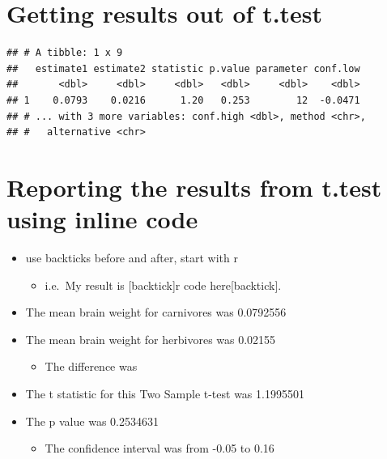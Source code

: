 \documentclass[
]{book}
\newenvironment{Shaded}{\begin{snugshade}}{\end{snugshade}}
\newcommand{\DataTypeTok}[1]{\textcolor[rgb]{0.13,0.29,0.53}{#1}}
\newcommand{\KeywordTok}[1]{\textcolor[rgb]{0.13,0.29,0.53}{\textbf{#1}}}
\newcommand{\NormalTok}[1]{#1}
\newcommand{\OperatorTok}[1]{\textcolor[rgb]{0.81,0.36,0.00}{\textbf{#1}}}
\newcommand{\StringTok}[1]{\textcolor[rgb]{0.31,0.60,0.02}{#1}}
\providecommand{\tightlist}{%
  \setlength{\itemsep}{0pt}\setlength{\parskip}{0pt}}
\begin{document}
\begin{Shaded}
\end{Shaded}

\hypertarget{getting-results-out-of-t.test-3}{%
\section{Getting results out of t.test}\label{getting-results-out-of-t.test-3}}

\begin{verbatim}
## # A tibble: 1 x 9
##   estimate1 estimate2 statistic p.value parameter conf.low
##       <dbl>     <dbl>     <dbl>   <dbl>     <dbl>    <dbl>
## 1    0.0793    0.0216      1.20   0.253        12  -0.0471
## # ... with 3 more variables: conf.high <dbl>, method <chr>,
## #   alternative <chr>
\end{verbatim}

\hypertarget{reporting-the-results-from-t.test-using-inline-code-1}{%
\section{Reporting the results from t.test using inline code}\label{reporting-the-results-from-t.test-using-inline-code-1}}

\begin{itemize}
\tightlist
\item
  use backticks before and after, start with r

  \begin{itemize}
  \tightlist
  \item
    i.e.~My result is {[}backtick{]}r code here{[}backtick{]}.
  \end{itemize}
\item
  The mean brain weight for carnivores was 0.0792556
\item
  The mean brain weight for herbivores was 0.02155

  \begin{itemize}
  \tightlist
  \item
    The difference was
  \end{itemize}
\item
  The t statistic for this Two Sample t-test was 1.1995501
\item
  The p value was 0.2534631

  \begin{itemize}
  \tightlist
  \item
    The confidence interval was from -0.05 to 0.16
  \end{itemize}
\end{itemize}
\end{document}

